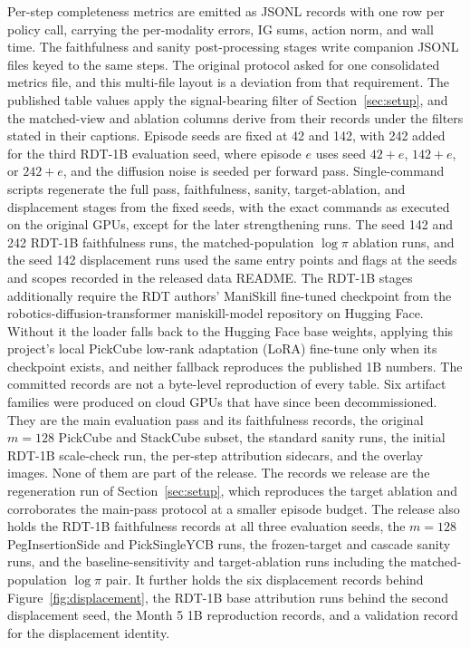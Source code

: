 \documentclass{article}
\begin{document}
Per-step completeness metrics are emitted as JSONL records with one row per policy call, carrying the per-modality errors, IG sums, action norm, and wall time.
The faithfulness and sanity post-processing stages write companion JSONL files keyed to the same steps.
The original protocol asked for one consolidated metrics file, and this multi-file layout is a deviation from that requirement.
The published table values apply the signal-bearing filter of Section~\ref{sec:setup}, and the matched-view and ablation columns derive from their records under the filters stated in their captions.
Episode seeds are fixed at 42 and 142, with 242 added for the third RDT-1B evaluation seed, where episode $e$ uses seed $42{+}e$, $142{+}e$, or $242{+}e$, and the diffusion noise is seeded per forward pass.
Single-command scripts regenerate the full pass, faithfulness, sanity, target-ablation, and displacement stages from the fixed seeds, with the exact commands as executed on the original GPUs, except for the later strengthening runs.
The seed 142 and 242 RDT-1B faithfulness runs, the matched-population $\log\pi$ ablation runs, and the seed 142 displacement runs used the same entry points and flags at the seeds and scopes recorded in the released data README.
The RDT-1B stages additionally require the RDT authors' ManiSkill fine-tuned checkpoint from the robotics-diffusion-transformer maniskill-model repository on Hugging Face.
Without it the loader falls back to the Hugging Face base weights, applying this project's local PickCube low-rank adaptation (LoRA) fine-tune only when its checkpoint exists, and neither fallback reproduces the published 1B numbers.
The committed records are not a byte-level reproduction of every table.
Six artifact families were produced on cloud GPUs that have since been decommissioned.
They are the main evaluation pass and its faithfulness records, the original $m{=}128$ PickCube and StackCube subset, the standard sanity runs, the initial RDT-1B scale-check run, the per-step attribution sidecars, and the overlay images.
None of them are part of the release.
The records we release are the regeneration run of Section~\ref{sec:setup}, which reproduces the target ablation and corroborates the main-pass protocol at a smaller episode budget.
The release also holds the RDT-1B faithfulness records at all three evaluation seeds, the $m{=}128$ PegInsertionSide and PickSingleYCB runs, the frozen-target and cascade sanity runs, and the baseline-sensitivity and target-ablation runs including the matched-population $\log\pi$ pair.
It further holds the six displacement records behind Figure~\ref{fig:displacement}, the RDT-1B base attribution runs behind the second displacement seed, the Month 5 1B reproduction records, and a validation record for the displacement identity.
\end{document}
